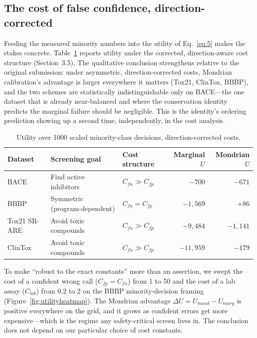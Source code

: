 \documentclass[11pt]{article}
\begin{document}
\subsection{The cost of false confidence, direction-corrected}

Feeding the measured minority numbers into the utility of Eq.~\ref{eq:5} makes the stakes concrete.
Table~\ref{tab:utility} reports utility under the corrected, direction-aware cost structure
(Section~3.5). The qualitative conclusion strengthens relative to the original submission: under
asymmetric, direction-corrected costs, Mondrian calibration's advantage is larger everywhere it
matters (Tox21, ClinTox, BBBP), and the two schemes are statistically indistinguishable only on
BACE---the one dataset that is already near-balanced and where the conservation identity predicts
the marginal failure should be negligible. This is the identity's ordering prediction showing up a
second time, independently, in the cost analysis.

\begin{table}[h]
\centering
\caption{Utility over 1000 scaled minority-class decisions, direction-corrected costs.}
\label{tab:utility}
\begin{tabular}{lllrr}
\toprule
Dataset & Screening goal & Cost structure & Marginal $U$ & Mondrian $U$ \\
\midrule
BACE & Find active inhibitors & $C_{fn}\gg C_{fp}$ & $-700$ & $-671$ \\
BBBP & Symmetric (program-dependent) & $C_{fn}=C_{fp}$ & $-1{,}569$ & $+86$ \\
Tox21 SR-ARE & Avoid toxic compounds & $C_{fn}\gg C_{fp}$ & $-9{,}484$ & $-1{,}141$ \\
ClinTox & Avoid toxic compounds & $C_{fn}\gg C_{fp}$ & $-11{,}959$ & $-179$ \\
\bottomrule
\end{tabular}
\end{table}

To make ``robust to the exact constants'' more than an assertion, we swept the cost of a confident
wrong call ($C_{fp}=C_{fn}$) from 1 to 50 and the cost of a lab assay ($C_{lab}$) from 0.2 to 2 on
the BBBP minority-decision framing (Figure~\ref{fig:utilityheatmap}). The Mondrian advantage
$\Delta U = U_{mond} - U_{marg}$ is positive everywhere on the grid, and it grows as confident
errors get more expensive---which is the regime any safety-critical screen lives in. The conclusion
does not depend on our particular choice of cost constants.
\end{document}

